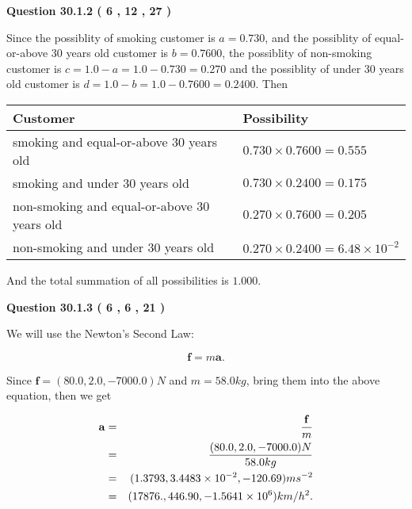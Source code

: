 \documentclass[12pt]{article}
\begin{document}
\vspace{0.2in}
  
{\textbf{\Large{Question
30.1.2 
 (           6 ,          12 ,          27 )
}}}
  
  
 
 

Since the possiblity of  %
smoking customer is $ a =  %
0.730 $,
and the possiblity of  %
equal-or-above 30 years old customer is $ b =  %
0.7600 $,
the possiblity of  %
non-smoking customer is $ c = 1.0 - a = 1.0 -
0.730
=  %
0.270 $ and the possiblity of  %
under 30 years old
customer is $ d = 1.0 - b = 1.0 -  %
0.7600 =  %
0.2400  $.
Then
 
\noindent
\begin{tabular}{|l|l|}
\hline
Customer & Possibility \\
\hline
smoking  and  %
equal-or-above 30 years old  &
  $ %
0.730 \times  %
0.7600 =  %
0.555$ \\
\hline
smoking  and  %
under 30 years old &
  $ %
0.730 \times  %
0.2400 =  %
0.175$ \\
\hline
 non-smoking and  %
equal-or-above 30 years old  &
  $ %
0.270 \times  %
0.7600 =  %
0.205$ \\
\hline
 non-smoking and  %
under 30 years old &
  $ %
0.270 \times  %
0.2400 =  %
6.48 \times 10^{-2}$ \\
\hline
\end{tabular}
 
\noindent
And the total summation of all possibilities is $  %
1.000 $.
 
 
 
 
  
\vspace{0.2in}
  
{\textbf{\Large{Question
30.1.3 
 (           6 ,           6 ,          21 )
}}}
  
  
 
 

We will use the Newton's Second Law:
 
\[
\mathbf{f}=m\mathbf{a}.
\]
 
Since $\mathbf{f}=( %
80.0,  %
2.0,  %
-7000.0 )N$
and $m= %
58.0 kg$, bring them into the above equation, then we get
 
\begin{eqnarray*}
\mathbf{a}&=&\frac{\mathbf{f}}m  \\
&=&\frac{(
80.0 ,
2.0 ,
-7000.0 )N
}{ %
58.0 kg}  \\
&=&(
1.3793 ,
3.4483 \times 10^{-2},
-120.69
)ms^{-2} \\
&=&(
17876. ,
446.90 ,
-1.5641 \times 10^{6}
)km/h^2.
\end{eqnarray*}
 
\end{document}
